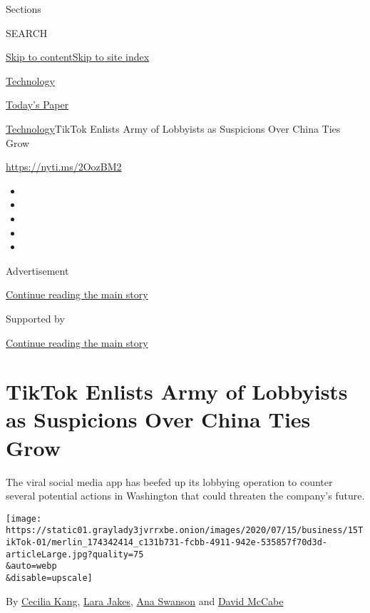 Sections

SEARCH

\protect\hyperlink{site-content}{Skip to
content}\protect\hyperlink{site-index}{Skip to site index}

\href{https://www.nytimes3xbfgragh.onion/section/technology}{Technology}

\href{https://myaccount.nytimes3xbfgragh.onion/auth/login?response_type=cookie\&client_id=vi}{}

\href{https://www.nytimes3xbfgragh.onion/section/todayspaper}{Today's
Paper}

\href{/section/technology}{Technology}\textbar{}TikTok Enlists Army of
Lobbyists as Suspicions Over China Ties Grow

\url{https://nyti.ms/2OozBM2}

\begin{itemize}
\item
\item
\item
\item
\item
\end{itemize}

Advertisement

\protect\hyperlink{after-top}{Continue reading the main story}

Supported by

\protect\hyperlink{after-sponsor}{Continue reading the main story}

\hypertarget{tiktok-enlists-army-of-lobbyists-as-suspicions-over-china-ties-grow}{%
\section{TikTok Enlists Army of Lobbyists as Suspicions Over China Ties
Grow}\label{tiktok-enlists-army-of-lobbyists-as-suspicions-over-china-ties-grow}}

The viral social media app has beefed up its lobbying operation to
counter several potential actions in Washington that could threaten the
company's future.

\texttt{[image: https://static01.graylady3jvrrxbe.onion/images/2020/07/15/business/15TikTok-01/merlin\_174342414\_c131b731-fcbb-4911-942e-535857f70d3d-articleLarge.jpg?quality=75\\\&auto=webp\\\&disable=upscale]}

By \href{https://www.nytimes3xbfgragh.onion/by/cecilia-kang}{Cecilia
Kang}, \href{https://www.nytimes3xbfgragh.onion/by/lara-jakes}{Lara
Jakes}, \href{https://www.nytimes3xbfgragh.onion/by/ana-swanson}{Ana
Swanson} and
\href{https://www.nytimes3xbfgragh.onion/by/david-mccabe}{David McCabe}

